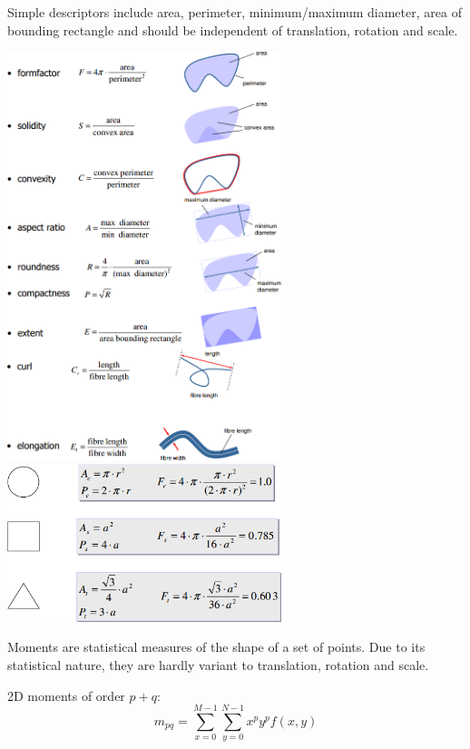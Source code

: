   \clearpage
  \begin{minipage}{9cm}
    Simple descriptors include area, perimeter, minimum/maximum diameter, area of bounding rectangle and
    should be independent of translation, rotation and scale.
     
    \includegraphics[width=8cm]{./images/simple_descriptors.png}
    \includegraphics[width=8cm]{./images/simple_descriptors_formfactors.png}
    
    
      Moments are statistical measures of the shape of a set of points. Due to its statistical
      nature, they are hardly variant to translation, rotation and scale.
      
      2D moments of order $p+q$: $$m_{pq} = \sum_{x=0}^{M-1} \sum_{y=0}^{N-1} x^p y^p f(x,y)$$
      
  \end{minipage}
